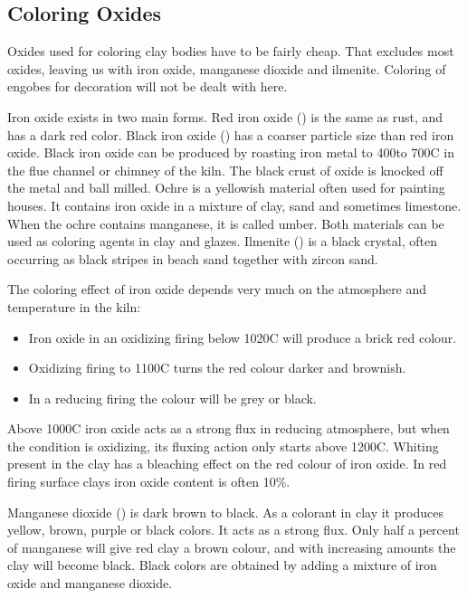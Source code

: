 \subsection{Coloring Oxides}
Oxides used for coloring clay bodies have to be fairly cheap. That excludes 
most oxides, leaving us with iron oxide, manganese dioxide and ilmenite. 
Coloring of engobes for decoration will not be dealt with here.

Iron oxide exists in two main forms. Red iron oxide () is the same as 
rust, and has a dark red color. Black iron oxide () has a coarser 
particle size than red iron oxide. Black iron oxide can be produced by roasting 
iron metal to 400\degree to 700\degree C in the flue channel or chimney of the 
kiln. The black crust of oxide is knocked off the metal and ball milled. Ochre 
is a yellowish material often used for painting houses. It contains iron oxide 
in a mixture of clay, sand and sometimes limestone. When the ochre contains 
manganese, it is called umber. Both materials can be used as coloring agents in 
clay and glazes. Ilmenite () is a black crystal, often occurring 
as black stripes in beach sand together with zircon sand.

The coloring effect of iron oxide depends very much on the atmosphere and 
temperature in the kiln:
\begin{itemize}
\item Iron oxide in an oxidizing firing below 1020\degree C will produce a 
brick red colour.
\item Oxidizing firing to 1100\degree C turns the red colour darker and 
brownish.
\item In a reducing firing the colour will be grey or black.
\end{itemize}
Above 1000\degree C iron oxide acts as a strong flux in reducing atmosphere, 
but when the condition is oxidizing, its fluxing action only starts above 
1200\degree C. Whiting present in the clay has a bleaching effect on the red 
colour of iron oxide. In red firing surface clays iron oxide content is often 
10\%.

Manganese dioxide () is dark brown to black. As a colorant in clay it 
produces yellow, brown, purple or black colors. It acts as a strong flux. Only 
half a percent of manganese will give red clay a brown colour, and with 
increasing amounts the clay will become black. Black colors are obtained by 
adding a mixture of iron oxide and manganese dioxide.
